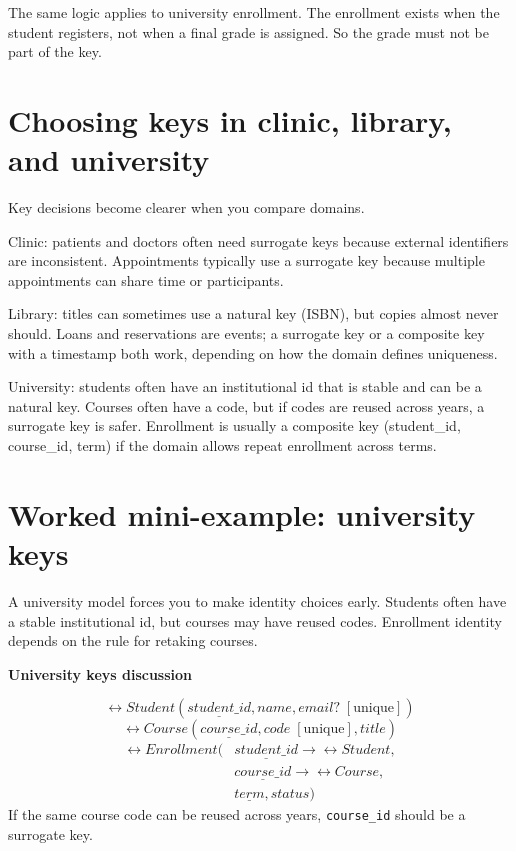 The same logic applies to university enrollment.
The enrollment exists when the student registers, not when a final grade is assigned.
So the grade must not be part of the key.

\section{Choosing keys in clinic, library, and university}
Key decisions become clearer when you compare domains.

Clinic:
patients and doctors often need surrogate keys because external identifiers are inconsistent.
Appointments typically use a surrogate key because multiple appointments can share time or participants.

Library:
titles can sometimes use a natural key (ISBN), but copies almost never should.
Loans and reservations are events; a surrogate key or a composite key with a timestamp both work, depending on how the domain defines uniqueness.

University:
students often have an institutional id that is stable and can be a natural key.
Courses often have a code, but if codes are reused across years, a surrogate key is safer.
Enrollment is usually a composite key (student\_id, course\_id, term) if the domain allows repeat enrollment across terms.

\section{Worked mini-example: university keys}
A university model forces you to make identity choices early.
Students often have a stable institutional id, but courses may have reused codes.
Enrollment identity depends on the rule for retaking courses.

\begin{examplebox}
\textbf{University keys discussion}\par\smallskip
\[
\rel{Student}(\underline{student\_id}, name, email? \;[\text{unique}])
\]
\[
\rel{Course}(\underline{course\_id}, code \;[\text{unique}], title)
\]
\[
\begin{aligned}
\rel{Enrollment}(&\underline{student\_id} \rightarrow \rel{Student}, \\
&\underline{course\_id} \rightarrow \rel{Course}, \\
&\underline{term}, status)
\end{aligned}
\]
If the same course code can be reused across years, \texttt{course\_id} should be a surrogate key.
\end{examplebox}

